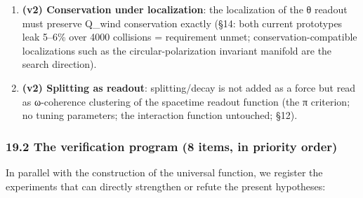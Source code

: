 \documentclass[
]{article}
\begin{document}
\begin{enumerate}
  that creates space.
\item
  \textbf{(v2) Conservation under localization}: the localization of the
  θ readout must preserve Q\_wind conservation exactly (§14: both
  current prototypes leak 5--6\% over 4000 collisions = requirement
  unmet; conservation-compatible localizations such as the
  circular-polarization invariant manifold are the search direction).
\item
  \textbf{(v2) Splitting as readout}: splitting/decay is not added as a
  force but read as ω-coherence clustering of the spacetime readout
  function (the π criterion; no tuning parameters; the interaction
  function untouched; §12).
\end{enumerate}

\subsubsection{19.2 The verification program (8 items, in priority
order)}\label{the-verification-program-8-items-in-priority-order}

In parallel with the construction of the universal function, we register
the experiments that can directly strengthen or refute the present
hypotheses:
\end{document}
